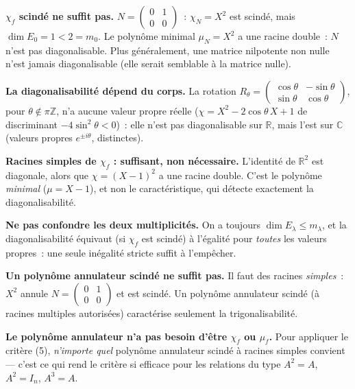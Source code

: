 \begin{mdframed}[style=cexbar]
  \textbf{$\chi_f$ scindé ne suffit pas.}\enspace%
  $N = \begin{pmatrix}0&1\\0&0\end{pmatrix}$~: $\chi_N = X^2$ est scindé,
  mais $\dim E_0 = 1 < 2 = m_0$. Le polynôme minimal $\mu_N = X^2$ a une
  racine double~: $N$ n'est pas diagonalisable. Plus généralement, une
  matrice nilpotente non nulle n'est jamais diagonalisable (elle serait
  semblable à la matrice nulle).

  \smallskip\noindent
  \textbf{La diagonalisabilité dépend du corps.}\enspace%
  La rotation $R_\theta = \begin{pmatrix}\cos\theta&-\sin\theta\\
  \sin\theta&\cos\theta\end{pmatrix}$, pour $\theta \notin \pi\mathbb{Z}$,
  n'a aucune valeur propre réelle ($\chi = X^2 - 2\cos\theta\,X + 1$ de
  discriminant $-4\sin^2\theta < 0$)~: elle n'est pas diagonalisable sur
  $\mathbb{R}$, mais l'est sur $\mathbb{C}$ (valeurs propres
  $e^{\pm i\theta}$, distinctes).

  \smallskip\noindent
  \textbf{Racines simples de $\chi_f$ : suffisant, non nécessaire.}\enspace%
  L'identité de $\mathbb{R}^2$ est diagonale, alors que
  $\chi = {(X-1)}^2$ a une racine double. C'est le polynôme \emph{minimal}
  ($\mu = X - 1$), et non le caractéristique, qui détecte exactement la
  diagonalisabilité.
\end{mdframed}

\vspace{6pt}

\begin{mdframed}[style=cexbar]
  \textbf{Ne pas confondre les deux multiplicités.}\enspace%
  On a toujours $\dim E_\lambda \leq m_\lambda$, et la diagonalisabilité
  équivaut (si $\chi_f$ est scindé) à l'égalité pour \emph{toutes} les
  valeurs propres~: une seule inégalité stricte suffit à l'empêcher.

  \smallskip\noindent
  \textbf{Un polynôme annulateur scindé ne suffit pas.}\enspace%
  Il faut des racines \emph{simples}~: $X^2$ annule
  $N = \begin{pmatrix}0&1\\0&0\end{pmatrix}$ et est scindé. Un polynôme
  annulateur scindé (à racines multiples autorisées) caractérise seulement
  la trigonalisabilité.

  \smallskip\noindent
  \textbf{Le polynôme annulateur n'a pas besoin d'être $\chi_f$ ou $\mu_f$.}\enspace%
  Pour appliquer le critère (5), \emph{n'importe quel} polynôme annulateur
  scindé à racines simples convient — c'est ce qui rend le critère si
  efficace pour les relations du type $A^2 = A$, $A^2 = I_n$, $A^3 = A$.
\end{mdframed}

